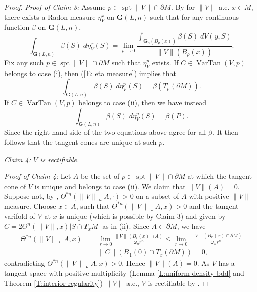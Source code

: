 \documentclass[10pt]{amsart}
\theoremstyle{definition}
\theoremstyle{remark}
\numberwithin{equation}{section}
\newcommand{\lc}{\llcorner}
\newcommand{\Gr}{\mathbf{G}}
\newcommand{\VarTan}{\operatorname{VarTan}}
\newcommand{\spt}{\operatorname{spt}}
\begin{document}
\begin{proof}
\vspace{.3cm}

\textit{Proof of Claim 3:} Assume $p \in \spt\|V\| \cap \partial M$. By \cite[Lemma 38.4]{Simon} for $\|V\|$-a.e. $x \in M$, there exists a Radon measure $\eta_V^x$ on $\Gr (L, n)$ such that for any continuous function $\beta$ on $\Gr (L, n)$,
\begin{equation}
\label{E: eta measure}
\int_{\Gr(L, n)}\beta(S)\; d\eta_V^x(S)=\lim_{\rho\to 0}\frac{\int_{\Gr_n(B_\rho(x))}\beta(S) \; dV(y, S)}{\|V\|(B_\rho(x))}.
\end{equation}
Fix any such $p \in \spt \|V\| \cap \partial M$ such that $\eta_V^p$ exists. If $C\in \VarTan(V,p)$ belongs to case (i), then (\ref{E: eta measure}) implies that 
\[ \int_{\Gr(L, n)}\beta(S) \; d\eta_V^p(S)=\beta(T_p(\partial M)).\]
If $C\in \VarTan(V,p)$ belongs to case (ii), then we have instead 
\[ \int_{\Gr(L, n)}\beta(S) \; d\eta_V^p(S)=\beta(P).\]
Since the right hand side of the two equations above agree for all $\beta$. It then follows that the tangent cones are unique at such $p$. 

\vspace{.3cm}

\textit{Claim 4: $V$ is rectifiable.}

\vspace{.3cm}

\textit{Proof of Claim 4:} Let $A$ be the set of $p \in \spt \|V\| \cap \partial M$ at which the tangent cone of $V$ is unique and belongs to case (ii). We claim that $\|V\|(A)=0$. Suppose not, by \cite[Theorem 3.2 (2)]{Simon}, $\Theta^{*n}(\|V\|\lc A, \cdot)>0$ on a subset of $A$ with positive $\|V\|$-measure. Choose $x\in A$, such that $\Theta^{*n}(\|V\|\lc A, x)>0$ and the tangent varifold of $V$ at $x$ is unique (which is possible by Claim 3) and given by $C=2\Theta^n(\|V\|, x) |S \cap T_x M|$ as in (ii). Since $A \subset \partial M$, we have
\begin{displaymath}
\begin{split}
\Theta^{*n}(\|V\|\lc A, x) & =\lim_{r\rightarrow 0}\frac{\|V\|(B_r(x)\cap A)}{\omega_n r^n}\leq \lim_{r\rightarrow 0}\frac{\|V\|(B_r(x)\cap \partial M)}{\omega_n r^n}\\
                                      & = \|C\| (B_1(0)\cap T_x (\partial M))=0,
\end{split}
\end{displaymath}
contradicting $\Theta^{*n}(\|V\|\lc A, x)>0$. Hence $\|V\|(A)=0$. As $V$ has a tangent space with positive multiplicity (Lemma \ref{L:uniform-density-bdd} and Theorem \ref{T:interior-regularity}) $\|V\|$-a.e., $V$ is rectifiable by \cite[Theorem 38.3]{Simon}.
\end{proof}
\end{document}
